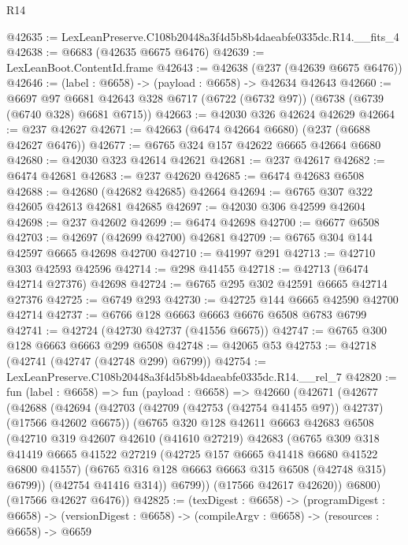 \begin{lexlean}{R14}
\begin{coremodule}
@42635 := LexLeanPreserve.C108b20448a3f4d5b8b4daeabfe0335dc.R14.__fits_4
@42638 := @6683 (@42635 @6675 @6476)
@42639 := LexLeanBoot.ContentId.frame
@42643 := @42638 (@237 (@42639 @6675 @6476))
@42646 := (label : @6658) -> (payload : @6658) -> @42634 @42643
@42660 := @6697
    @97
    @6681
    @42643
    @328
    @6717
    (@6722 (@6732 @97))
    (@6738 (@6739 (@6740 @328) @6681 @6715))
@42663 := @42030 @326 @42624 @42629
@42664 := @237 @42627
@42671 := @42663 (@6474 @42664 @6680) (@237 (@6688 @42627 @6476))
@42677 := @6765 @324 @157 @42622 @6665 @42664 @6680
@42680 := @42030 @323 @42614 @42621
@42681 := @237 @42617
@42682 := @6474 @42681
@42683 := @237 @42620
@42685 := @6474 @42683 @6508
@42688 := @42680 (@42682 @42685) @42664
@42694 := @6765 @307 @322 @42605 @42613 @42681 @42685
@42697 := @42030 @306 @42599 @42604
@42698 := @237 @42602
@42699 := @6474 @42698
@42700 := @6677 @6508
@42703 := @42697 (@42699 @42700) @42681
@42709 := @6765 @304 @144 @42597 @6665 @42698 @42700
@42710 := @41997 @291
@42713 := @42710 @303 @42593 @42596
@42714 := @298 @41455
@42718 := @42713 (@6474 @42714 @27376) @42698
@42724 := @6765 @295 @302 @42591 @6665 @42714 @27376
@42725 := @6749 @293
@42730 := @42725 @144 @6665 @42590 @42700 @42714
@42737 := @6766 @128 @6663 @6663 @6676 @6508 @6783 @6799
@42741 := @42724 (@42730 @42737 (@41556 @6675))
@42747 := @6765 @300 @128 @6663 @6663 @299 @6508
@42748 := @42065 @53
@42753 := @42718 (@42741 (@42747 (@42748 @299) @6799))
@42754 := LexLeanPreserve.C108b20448a3f4d5b8b4daeabfe0335dc.R14.__rel_7
@42820 := fun (label : @6658) =>
  fun (payload : @6658) =>
  @42660
    (@42671
      (@42677
        (@42688
          (@42694
            (@42703 (@42709 (@42753 (@42754 @41455 @97)) @42737) (@17566 @42602 @6675))
            (@6765
              @320
              @128
              @42611
              @6663
              @42683
              @6508
              (@42710
                @319
                @42607
                @42610
                (@41610 @27219)
                @42683
                (@6765
                  @309
                  @318
                  @41419
                  @6665
                  @41522
                  @27219
                  (@42725 @157 @6665 @41418 @6680 @41522 @6800 @41557)
                  (@6765 @316 @128 @6663 @6663 @315 @6508 (@42748 @315) @6799))
                (@42754 @41416 @314))
              @6799))
          (@17566 @42617 @42620))
        @6800)
      (@17566 @42627 @6476))
@42825 := (texDigest : @6658) ->
  (programDigest : @6658) ->
  (versionDigest : @6658) -> (compileArgv : @6658) -> (resources : @6658) -> @6659

\end{coremodule}
\end{lexlean}
